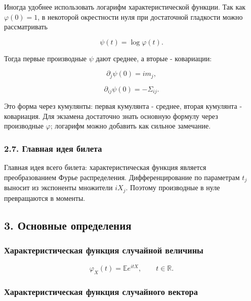 \documentclass[
  11pt,
  a4paper,
]{article}
\begin{document}
Иногда удобнее использовать логарифм характеристической функции. Так как
\(\varphi(0)=1\), в некоторой окрестности нуля при достаточной гладкости
можно рассматривать

\[
\psi(t)=\log\varphi(t).
\]

Тогда первые производные \(\psi\) дают среднее, а вторые - ковариации:

\[
\partial_j\psi(0)=i m_j,
\]

\[
\partial_{ij}\psi(0)=-\Sigma_{ij}.
\]

Это форма через кумулянты: первая кумулянта - среднее, вторая кумулянта
- ковариация. Для экзамена достаточно знать основную формулу через
производные \(\varphi\); логарифм можно добавить как сильное замечание.

\subsubsection{2.7. Главная идея
билета}\label{ux433ux43bux430ux432ux43dux430ux44f-ux438ux434ux435ux44f-ux431ux438ux43bux435ux442ux430}

Главная идея всего билета: характеристическая функция является
преобразованием Фурье распределения. Дифференцирование по параметрам
\(t_j\) выносит из экспоненты множители \(iX_j\). Поэтому производные в
нуле превращаются в моменты.

\subsection{3. Основные
определения}\label{ux43eux441ux43dux43eux432ux43dux44bux435-ux43eux43fux440ux435ux434ux435ux43bux435ux43dux438ux44f}

\subsubsection{Характеристическая функция случайной
величины}\label{ux445ux430ux440ux430ux43aux442ux435ux440ux438ux441ux442ux438ux447ux435ux441ux43aux430ux44f-ux444ux443ux43dux43aux446ux438ux44f-ux441ux43bux443ux447ux430ux439ux43dux43eux439-ux432ux435ux43bux438ux447ux438ux43dux44b}

\[
\varphi_X(t)=\mathbb E e^{itX},
\qquad t\in\mathbb R.
\]

\subsubsection{Характеристическая функция случайного
вектора}\label{ux445ux430ux440ux430ux43aux442ux435ux440ux438ux441ux442ux438ux447ux435ux441ux43aux430ux44f-ux444ux443ux43dux43aux446ux438ux44f-ux441ux43bux443ux447ux430ux439ux43dux43eux433ux43e-ux432ux435ux43aux442ux43eux440ux430}
\end{document}
